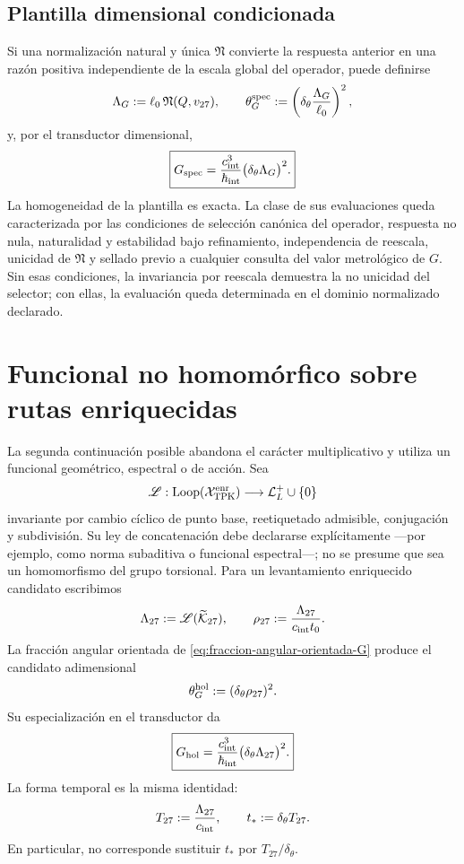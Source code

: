 \subsection{Plantilla dimensional condicionada}

Si una normalización natural y única \(\mathfrak N\) convierte la respuesta
anterior en una razón positiva independiente de la escala global del
operador, puede definirse
\[
 \Lambda_G
 :=\ell_0\,\mathfrak N(Q,v_{27}),
 \qquad
 \theta_G^{\rm spec}
 :=
 \left(
 \delta_\theta\frac{\Lambda_G}{\ell_0}
 \right)^2,
\]
y, por el transductor dimensional,
\[
 \boxed{
 G_{\rm spec}
 =
 \frac{c_{\rm int}^{3}}{\hbar_{\rm int}}
 \bigl(\delta_\theta\Lambda_G\bigr)^2.}
\]
La homogeneidad de la plantilla es exacta. La clase de sus evaluaciones queda
caracterizada por las condiciones de selección canónica del operador,
respuesta no nula, naturalidad y estabilidad bajo refinamiento, independencia
de reescala, unicidad de \(\mathfrak N\) y sellado previo a cualquier consulta
del valor metrológico de \(G\). Sin esas condiciones, la invariancia por
reescala demuestra la no unicidad del selector; con ellas, la evaluación queda
determinada en el dominio normalizado declarado.

\section{Funcional no homomórfico sobre rutas enriquecidas}
\label{sec:funcional-longitud-K27-G}

La segunda continuación posible abandona el carácter multiplicativo y utiliza
un funcional geométrico, espectral o de acción. Sea
\[
 \mathscr L:
 \operatorname{Loop}(\mathcal X_{\rm TPK}^{\rm enr})
 \longrightarrow\mathcal L_L^+\cup\{0\}
\]
invariante por cambio cíclico de punto base, reetiquetado admisible,
conjugación y subdivisión. Su ley de concatenación debe declararse
explícitamente ---por ejemplo, como norma subaditiva o funcional espectral---;
no se presume que sea un homomorfismo del grupo torsional. Para un
levantamiento enriquecido candidato escribimos
\[
 \Lambda_{27}:=\mathscr L(\widetilde{\mathcal K}_{27}),
 \qquad
 \rho_{27}:=\frac{\Lambda_{27}}{c_{\rm int}t_0}.
\]
La fracción angular orientada de
\eqref{eq:fraccion-angular-orientada-G} produce el candidato adimensional
\[
 \theta_G^{\rm hol}:=(\delta_\theta\rho_{27})^2.
\]
Su especialización en el transductor da
\[
 \boxed{
 G_{\rm hol}
 =\frac{c_{\rm int}^{3}}{\hbar_{\rm int}}
  \bigl(\delta_\theta\Lambda_{27}\bigr)^2.}
\]
La forma temporal es la misma identidad:
\[
 T_{27}:=\frac{\Lambda_{27}}{c_{\rm int}},
 \qquad
 t_\ast:=\delta_\theta T_{27}.
\]
En particular, no corresponde sustituir \(t_\ast\) por
\(T_{27}/\delta_\theta\).

